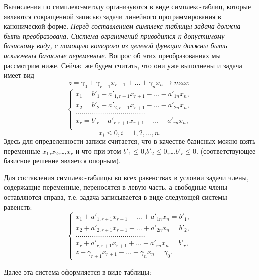 \documentclass{article}
\begin{document}
Вычисления по симплекс-методу организуются в виде симплекс-таблиц, которые являются сокращенной записью задачи линейного программирования в канонической форме. \textit{Перед составлением симплекс-таблицы задача должна быть преобразована. Система ограничений приводится к допустимому базисному виду, с помощью которого из целевой функции должны быть исключены базисные  переменные.} Вопрос об этих преобразованиях мы рассмотрим ниже. Сейчас же будем считать, что они уже выполнены и задача имеет вид
$$ z = \gamma_0 + \gamma_{r+1}x_{r+1} + \dots  + \gamma_nx_n \rightarrow max;$$ 
\begin{equation*}
\begin{cases}
x_1 = b'_1 - a'_{1,r+1}x_{r+1} - \dots - a'_{1n}x_n,\\
x_2 = b'_2 - a'_{2,r+1}x_{r+1} - \dots - a'_{2n}x_n,\\
\dots\dots\dots\dots\dots\dots\dots\dots\dots\dots\dots\dots\\
x_r = b'_r - a'_{r,r+1}x_{r+1} - \dots - a'_{rn}x_n,\\
\end{cases}
\end{equation*}
$$ x_i \leq 0, i = 1, 2, \dots , n.$$
Здесь для определенности записи считается, что в качестве базисных можно взять переменные $x_1$,$x_2$,\dots,$x_r$ и что при этом $b'_1 \leq 0$,$b'_2 \leq 0$,\dots,$b'_r \leq 0$. (соответствующее  базисное решение является опорным).

Для составления симплекс-таблицы во всех равенствах в условии  задачи члены, содержащие переменные, переносятся в левую часть, а свободные члены оставляются справа, т.е. задача записывается в виде следующей системы равенств:
\begin{equation*}
\begin{cases}
x_1 +  a'_{1,r+1}x_{r+1} + \dots + a'_{1n}x_n = b'_1,\\
x_2 +  a'_{2,r+1}x_{r+1} + \dots + a'_{2n}x_n = b'_2,\\
\dots\dots\dots\dots\dots\dots\dots\dots\dots\dots\dots\dots\\
x_r +  a'_{r,r+1}x_{r+1} + \dots + a'_{rn}x_n = b'_r,\\
z - \gamma_{r+1} x_{r+1} - \dots - \gamma_nx_n = \gamma_0.
\end{cases}
\end{equation*}

Далее эта система оформляется  в виде таблицы:
\end{document}
